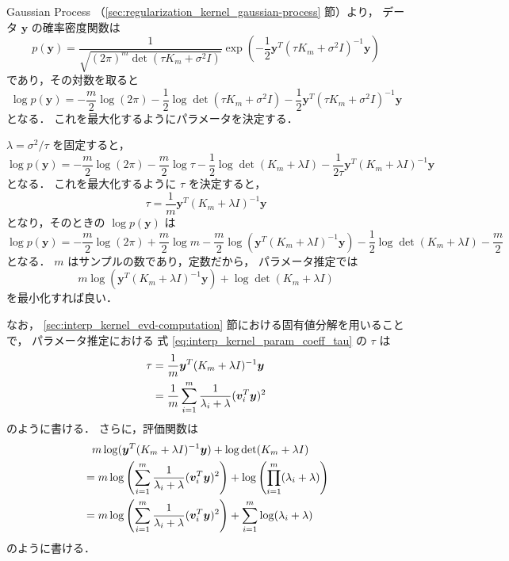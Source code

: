 Gaussian Process （\ref{sec:regularization_kernel_gaussian-process} 節）より，
データ $\bm{y}$ の確率密度関数は
\begin{equation}
    p(\bm{y}) = \frac{1}{\sqrt{(2\pi)^{m} \det(\tau K_m + \sigma^2 I)}}
    \exp\left(-\frac{1}{2} \bm{y}^T (\tau K_m + \sigma^2 I)^{-1} \bm{y} \right)
\end{equation}
であり，その対数を取ると
\begin{equation}
    \log{p(\bm{y})}
    = -\frac{m}{2}\log(2\pi)
    - \frac{1}{2} \log{\det(\tau K_m + \sigma^2 I)}
    - \frac{1}{2} \bm{y}^T (\tau K_m + \sigma^2 I)^{-1} \bm{y}
\end{equation}
となる．
これを最大化するようにパラメータを決定する．

$\lambda = \sigma^2 / \tau$ を固定すると，
\begin{equation}
    \log{p(\bm{y})}
    = -\frac{m}{2}\log(2\pi)
    - \frac{m}{2} \log{\tau}
    - \frac{1}{2} \log{\det(K_m + \lambda I)}
    - \frac{1}{2\tau} \bm{y}^T (K_m + \lambda I)^{-1} \bm{y}
\end{equation}
となる．
これを最大化するように $\tau$ を決定すると，
\begin{equation}
    \tau = \frac{1}{m} \bm{y}^T (K_m + \lambda I)^{-1} \bm{y}
    \label{eq:interp_kernel_param_coeff_tau}
\end{equation}
となり，そのときの $\log{p(\bm{y})}$ は
\begin{equation}
    \log{p(\bm{y})}
    = -\frac{m}{2}\log(2\pi)
    + \frac{m}{2} \log{m}
    - \frac{m}{2} \log(\bm{y}^T (K_m + \lambda I)^{-1} \bm{y})
    - \frac{1}{2} \log{\det(K_m + \lambda I)}
    - \frac{m}{2}
\end{equation}
となる．
$m$ はサンプルの数であり，定数だから，
パラメータ推定では
\begin{equation}
    m \log(\bm{y}^T (K_m + \lambda I)^{-1} \bm{y})
    + \log{\det(K_m + \lambda I)}
\end{equation}
を最小化すれば良い．

なお，
\ref{sec:interp_kernel_evd-computation} 節における固有値分解を用いることで，
パラメータ推定における
式 \eqref{eq:interp_kernel_param_coeff_tau} の $\tau$ は
\begin{align}
    \tau
     & = \frac{1}{m} \bm{y}^T (K_m + \lambda I)^{-1} \bm{y} \notag                    \\
     & = \frac{1}{m} \sum_{i=1}^m \frac{1}{\lambda_i + \lambda} (\bm{v}_i^T \bm{y})^2
\end{align}
のように書ける．
さらに，評価関数は
\begin{align}
     & \hphantom{=}
    m \log(\bm{y}^T (K_m + \lambda I)^{-1} \bm{y})
    + \log{\det(K_m + \lambda I)}
    \notag                                                                                   \\
     & = m \log\left(\sum_{i=1}^m \frac{1}{\lambda_i + \lambda} (\bm{v}_i^T \bm{y})^2\right)
    + \log\left(\prod_{i=1}^m (\lambda_i + \lambda)\right)
    \notag                                                                                   \\
     & = m \log\left(\sum_{i=1}^m \frac{1}{\lambda_i + \lambda} (\bm{v}_i^T \bm{y})^2\right)
    + \sum_{i=1}^m \log(\lambda_i + \lambda)
\end{align}
のように書ける．
